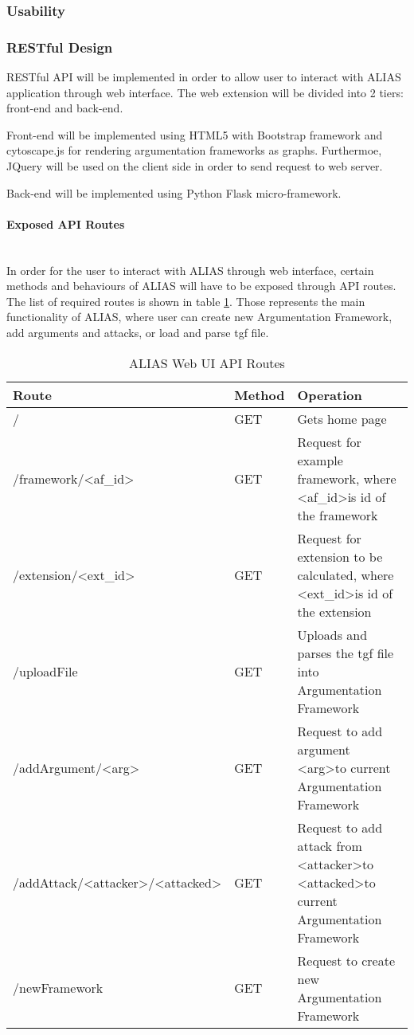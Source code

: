 \subsubsection{Usability}


\subsubsection{RESTful Design}
RESTful API will be implemented in order to allow user to interact with ALIAS application through web interface. The web extension will be divided into 2 tiers: front-end and back-end. 

Front-end will be implemented using HTML5 with Bootstrap framework and cytoscape.js \citep{cytoscapejs} for rendering argumentation frameworks as graphs. Furthermoe, JQuery will be used on the client side in order to send request to web server.

Back-end will be implemented using Python Flask \citep{flaskDocs} micro-framework.

\paragraph{Exposed API Routes} \mbox{} \\
In order for the user to interact with ALIAS through web interface, certain methods and behaviours of ALIAS will have to be exposed through API routes. The list of required routes is shown in table \ref{table:apiRoutes}. Those represents the main functionality of ALIAS, where user can create new Argumentation Framework, add arguments and attacks, or load and parse tgf file.


\begin{table}[]
	\centering
		\begin{tabular}{|p{7cm}|p{1.5cm}|p{4.5cm}|}
			\hline
			\textbf{Route} & \textbf{Method} & \textbf{Operation}  \\ \hline \hline
			/ & GET & Gets home page \\ \hline
			/framework/\textless{}af\_id\textgreater{} & GET & Request for example framework, where \textless{}af\_id\textgreater is id of the framework \\ \hline
			/extension/\textless{}ext\_id\textgreater{} & GET & Request for extension to be calculated, where \textless{}ext\_id\textgreater is id of the extension \\ \hline
			/uploadFile & GET & Uploads and parses the tgf file into Argumentation Framework \\ \hline
			/addArgument/\textless{}arg\textgreater{} & GET & Request to add argument \textless{}arg\textgreater to current Argumentation Framework \\ \hline
			/addAttack/\textless{}attacker\textgreater{}/\textless{}attacked\textgreater{} & GET & Request to add attack from \textless{}attacker\textgreater to \textless{}attacked\textgreater to current Argumentation Framework \\ \hline
			/newFramework & GET & Request to create new Argumentation Framework \\ \hline
		\end{tabular}%
	\caption{ALIAS Web UI API Routes}
	\label{table:apiRoutes}
\end{table}

